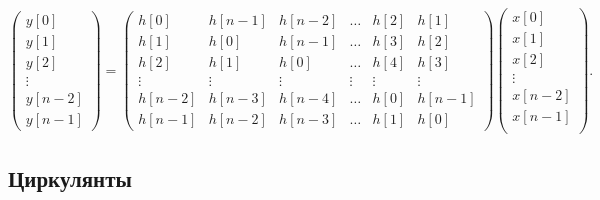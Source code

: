 \[
    \begin{pmatrix}
        y[0]   \\
        y[1]   \\
        y[2]   \\
        \vdots \\
        y[n-2] \\
        y[n-1]
    \end{pmatrix}
    = \begin{pmatrix}
          h[0]   & h[n-1] & h[n-2] & \dots  & h[2]   & h[1]   \\
          h[1]   & h[0]   & h[n-1] & \dots  & h[3]   & h[2]   \\
          h[2]   & h[1]   & h[0]   & \dots  & h[4]   & h[3]   \\
          \vdots & \vdots & \vdots & \vdots & \vdots & \vdots \\
          h[n-2] & h[n-3] & h[n-4] & \dots  & h[0]   & h[n-1] \\
          h[n-1] & h[n-2] & h[n-3] & \dots  & h[1]   & h[0]
    \end{pmatrix}
    \begin{pmatrix}
        x[0]   \\
        x[1]   \\
        x[2]   \\
        \vdots \\
        x[n-2] \\
        x[n-1] \\
    \end{pmatrix} .
\]

\subsection{Циркулянты}

